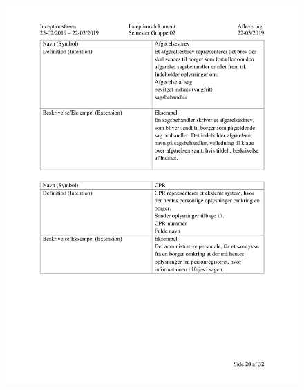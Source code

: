 \begin{figure}[hb]
  \includegraphics[scale = 0.33]{./PNG/Inceptions/Gruppe 02 + InceptionsDokument-21.jpg} 
\end{figure}

